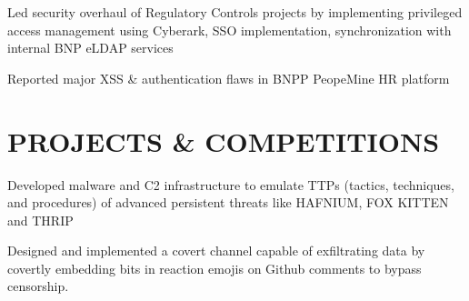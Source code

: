 \documentclass[letterpaper]{deedy-resume} %
\begin{document}
\begin{minipage}[t]{0.66\textwidth}



\begin{tightitemize}
\item Led security overhaul of Regulatory Controls projects by implementing privileged access management using Cyberark, SSO implementation, synchronization with internal BNP eLDAP services
\item  Reported major XSS \& authentication flaws in BNPP PeopeMine HR platform
\end{tightitemize}

\sectionspace %



\section{PROJECTS \& COMPETITIONS}


Developed malware and C2 infrastructure to emulate TTPs (tactics, techniques, and procedures) of advanced persistent threats like HAFNIUM, FOX KITTEN and THRIP
\sectionspace %



Designed and implemented a covert channel capable of exfiltrating data by covertly embedding bits in reaction emojis on Github comments to bypass censorship.

\sectionspace %






\end{minipage}
\end{document}
